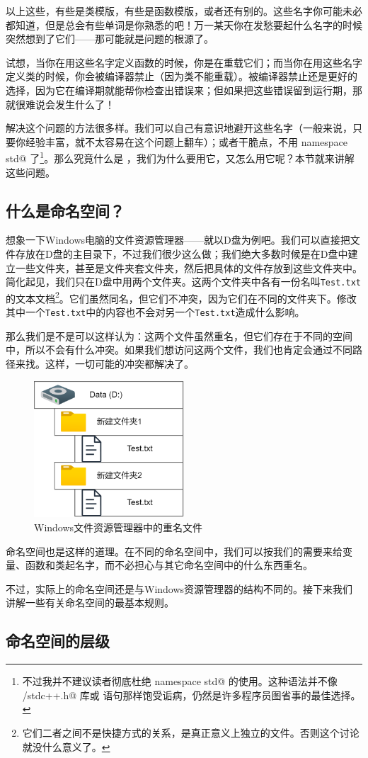 以上这些，有些是类模版，有些是函数模版，或者还有别的。这些名字你可能未必都知道，但是总会有些单词是你熟悉的吧！万一某天你在发愁要起什么名字的时候突然想到了它们——那可能就是问题的根源了。\par
试想，当你在用这些名字定义函数的时候，你是在重载它们；而当你在用这些名字定义类的时候，你会被编译器禁止（因为类不能重载）。被编译器禁止还是更好的选择，因为它在编译期就能帮你检查出错误来；但如果把这些错误留到运行期，那就很难说会发生什么了！\par
解决这个问题的方法很多样。我们可以自己有意识地避开这些名字（一般来说，只要你经验丰富，就不太容易在这个问题上翻车）；或者干脆点，不用 \lstinline@using namespace std@ 了\footnote{不过我并不建议读者彻底杜绝 \lstinline@using namespace std@ 的使用。这种语法并不像 \lstinline@bits/stdc++.h@ 库或 \lstinline@goto@ 语句那样饱受诟病，仍然是许多程序员图省事的最佳选择。}。那么究竟什么是 \lstinline@namespace@，我们为什么要用它，又怎么用它呢？本节就来讲解这些问题。\par
\subsection*{什么是命名空间？}
想象一下Windows电脑的文件资源管理器——就以D盘为例吧。我们可以直接把文件存放在D盘的主目录下，不过我们很少这么做；我们绝大多数时候是在D盘中建立一些文件夹，甚至是文件夹套文件夹，然后把具体的文件存放到这些文件夹中。简化起见，我们只在D盘中用两个文件夹。这两个文件夹中各有一份名叫\texttt{Test.txt}的文本文档\footnote{它们二者之间不是快捷方式的关系，是真正意义上独立的文件。否则这个讨论就没什么意义了。}。它们虽然同名，但它们不冲突，因为它们在不同的文件夹下。修改其中一个\texttt{Test.txt}中的内容也不会对另一个\texttt{Test.txt}造成什么影响。\par
那么我们是不是可以这样认为：这两个文件虽然重名，但它们存在于不同的空间中，所以不会有什么冲突。如果我们想访问这两个文件，我们也肯定会通过不同路径来找。这样，一切可能的冲突都解决了。\par
\begin{figure}[htbp]
    \centering
    \includegraphics[width=0.5\textwidth]{../images/generalized_parts/07_file_explorer_and_namespaces_300.png}
    \caption{Windows文件资源管理器中的重名文件}
\end{figure}
命名空间也是这样的道理。在不同的命名空间中，我们可以按我们的需要来给变量、函数和类起名字，而不必担心与其它命名空间中的什么东西重名。\par
不过，实际上的命名空间还是与Windows资源管理器的结构不同的。接下来我们讲解一些有关命名空间的最基本规则。\par
\subsection*{命名空间的层级}
